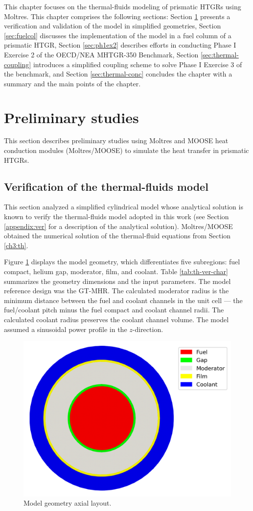 \label{ch:thermalfluids}

This chapter focuses on the thermal-fluids modeling of prismatic HTGRs using Moltres.
This chapter comprises the following sections: 
Section \ref{sec:thermal-prelim} presents a verification and validation of the model in simplified geometries,
Section \ref{sec:fuelcol} discusses the implementation of the model in a fuel column of a prismatic HTGR,
Section \ref{sec:ph1ex2} describes efforts in conducting Phase I Exercise 2 of the OECD/NEA MHTGR-350 Benchmark, 
Section \ref{sec:thermal-coupling} introduces a simplified coupling scheme to solve Phase I Exercise 3 of the benchmark,
and Section \ref{sec:thermal-conc} concludes the chapter with a summary and the main points of the chapter.

\section{Preliminary studies}
\label{sec:thermal-prelim}

This section describes preliminary studies using Moltres and MOOSE heat conduction modules (Moltres/MOOSE) to simulate the heat transfer in prismatic HTGRs.

\subsection{Verification of the thermal-fluids model}
\label{sec:tf-ver}

This section analyzed a simplified cylindrical model whose analytical solution is known to verify the thermal-fluids model adopted in this work (see Section \ref{appendix:ver} for a description of the analytical solution).
Moltres/MOOSE obtained the numerical solution of the thermal-fluid equations from Section \ref{ch3:th}.

Figure \ref{fig:th-ver-mesh} displays the model geometry, which differentiates five subregions: fuel compact, helium gap, moderator, film, and coolant.
Table \ref{tab:th-ver-char} summarizes the geometry dimensions and the input parameters.
The model reference design was the GT-MHR.
The calculated moderator radius is the minimum distance between the fuel and coolant channels in the unit cell --- the fuel/coolant pitch minus the fuel compact and coolant channel radii.
The calculated coolant radius preserves the coolant channel volume.
The model assumed a sinusoidal power profile in the $z$-direction.

\begin{figure}[htbp!]
	\centering
	\includegraphics[width=0.40\linewidth]{figures-thermal/ver-mesh2}
	\hfill
	\caption{Model geometry axial layout.}
	\label{fig:th-ver-mesh}
\end{figure}

